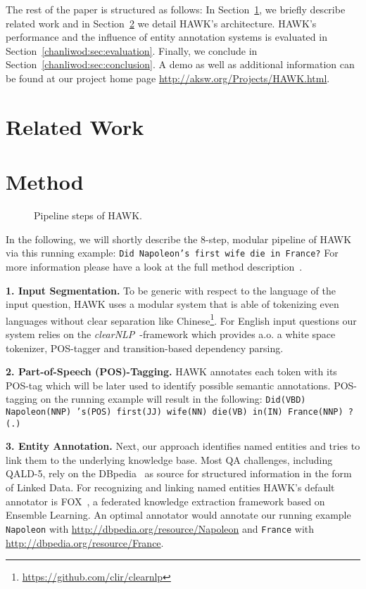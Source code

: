 The rest of the paper is structured as follows:
In Section~\ref{chanliwod:sec:relatedwork}, we briefly describe related work and in Section~\ref{chanliwod:sec:method} we detail HAWK's architecture.
HAWK's performance and the influence of entity annotation systems is evaluated in Section~\ref{chanliwod:sec:evaluation}. 
Finally, we conclude in Section~\ref{chanliwod:sec:conclusion}. 
A demo as well as additional information can be found at our project home page \url{http://aksw.org/Projects/HAWK.html}.


\section{Related Work} 
\label{chanliwod:sec:relatedwork}


\section{Method}
\label{chanliwod:sec:method}
\begin{figure}[htb!]
\centering

\caption{Pipeline steps of HAWK.}
\label{fig:hawk_pipeline}
\end{figure}


In the following, we will shortly describe the 8-step, modular pipeline of HAWK via this running example: \texttt{Did Napoleon's first wife die in France?}
For more information please have a look at the full method description~\cite{HAWK_2015}.


\textbf{1. Input Segmentation.} 
To be generic with respect to the language of the input question, HAWK uses a modular system that is able of tokenizing even languages without clear separation like Chinese\footnote{\url{https://github.com/clir/clearnlp}}.
For English input questions our system relies on the \emph{clearNLP}~\cite{choi2011getting}-framework which provides a.o. a white space tokenizer, POS-tagger and transition-based dependency parsing.

\textbf{2. Part-of-Speech (POS)-Tagging.} 
HAWK annotates each token with its POS-tag which will be later used to identify possible semantic annotations. 
POS-tagging on the running example will result in the following: \texttt{Did(VBD) Napoleon(NNP) 's(POS) first(JJ) wife(NN) die(VB) in(IN) France(NNP) ?(.)}

\textbf{3. Entity Annotation.} 
Next, our approach identifies named entities and tries to link them to the underlying knowledge base. 
Most QA challenges, including QALD-5, rely on the DBpedia~\cite{jl_2014/swj_dbpedia} as source for structured information in the form of Linked Data. 
For recognizing and linking named entities HAWK's default annotator is FOX~\cite{FOX}, a federated knowledge extraction framework based on Ensemble Learning. 
An optimal annotator would annotate our running example \texttt{Napoleon} with \url{http://dbpedia.org/resource/Napoleon} and \texttt{France} with \url{http://dbpedia.org/resource/France}.

